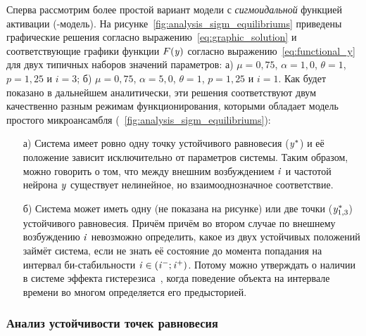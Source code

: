 Сперва рассмотрим более простой вариант модели с \textit{сигмоидальной} функцией активации (-модель). На рисунке~\ref{fig:analysis_sigm_equilibriums} приведены графические решения согласно выражению~\eqref{eq:graphic_solution} и соответствующие графики функции $F(\mathit{y})$ согласно выражению~\eqref{eq:functional_y} для двух типичных наборов значений параметров: а) $\mu = 0,75$, $\alpha = 1,0$, $\theta = 1$, $p = 1,25$ и $i = 3$; б) $\mu = 0,75$, $\alpha = 5,0$, $\theta = 1$, $p = 1,25$ и $i = 1$.
Как будет показано в дальнейшем аналитически, эти решения соответствуют двум качественно разным режимам функционирования, которыми обладает модель простого микроансамбля (\seefigure~\ref{fig:analysis_sigm_equilibriums}):
\begin{itemize}
    \item[а)] Система имеет ровно одну точку устойчивого равновесия ($\mathit{y}^{*}$) и её положение зависит исключительно от параметров системы. Таким образом, можно говорить о том, что между внешним возбуждением $\mathit{i}$ и частотой нейрона $\mathit{y}$ существует нелинейное, но взаимооднозначное соответствие.
    \item[б)] Система может иметь одну (не показана на рисунке) или две точки ($\mathit{y}_{1,3}^{*}$) устойчивого равновесия. Причём причём во втором случае по внешнему возбуждению $\mathit{i}$ невозможно определить, какое из двух устойчивых положений займёт система, если не знать её состояние до момента попадания на интервал би-стабильности $\mathit{i} \in (\mathit{i}^{-}; \mathit{i}^{+})$. Потому можно утверждать о наличии в системе эффекта гистерезиса~\cite{Krasnoselsky1983}, когда поведение объекта на интервале времени во многом определяется его предысторией.
\end{itemize}

\subsubsection{Анализ устойчивости точек равновесия}


